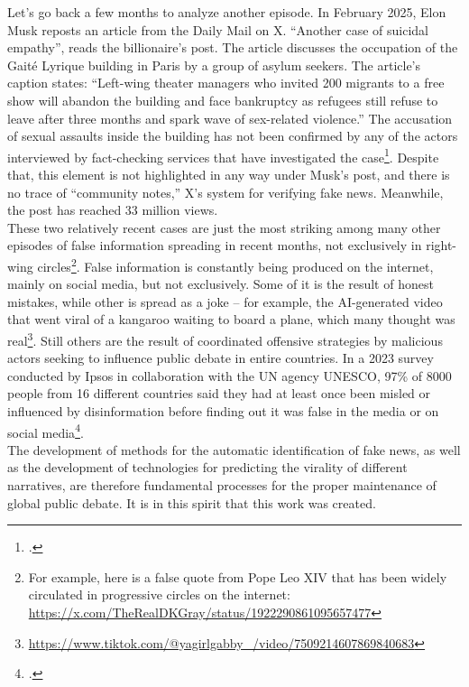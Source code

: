 \documentclass[a4paper,twoside,12pt]{book}
\begin{document}
	Let's go back a few months to analyze another episode. In February 2025, Elon Musk reposts an article from the Daily Mail on X. \enquote{Another case of suicidal empathy}, reads the billionaire's post. The article discusses the occupation of the Gaité Lyrique building in Paris by a group of asylum seekers. The article's caption states: \enquote{Left-wing theater managers who invited 200 migrants to a free show will abandon the building and face bankruptcy as refugees still refuse to leave after three months and spark wave of sex-related violence.} The accusation of sexual assaults inside the building has not been confirmed by any of the actors interviewed by fact-checking services that have investigated the case\footcite{pezet}. Despite that, this element is not highlighted in any way under Musk's post, and there is no trace of “community notes,” X's system for verifying fake news. Meanwhile, the post has reached 33 million views.\\
	
	These two relatively recent cases are just the most striking among many other episodes of false information spreading in recent months, not exclusively in right-wing circles\footnote{For example, here is a false quote from Pope Leo XIV that has been widely circulated in progressive circles on the internet: \url{https://x.com/TheRealDKGray/status/1922290861095657477}}. False information is constantly being produced on the internet, mainly on social media, but not exclusively. Some of it is the result of honest mistakes, while other is spread as a joke -- for example, the AI-generated video that went viral of a kangaroo waiting to board a plane, which many thought was real\footnote{\url{https://www.tiktok.com/@yagirlgabby_/video/7509214607869840683}}. Still others are the result of coordinated offensive strategies by malicious actors seeking to influence public debate in entire countries. In a 2023 survey conducted by Ipsos in collaboration with the UN agency UNESCO, 97\% of 8000 people from 16 different countries said they had at least once been misled or influenced by disinformation before finding out it was false in the media or on social media\footcite{ipsos2023}.\\
	
	The development of methods for the automatic identification of fake news, as well as the development of technologies for predicting the virality of different narratives, are therefore fundamental processes for the proper maintenance of global public debate.	It is in this spirit that this work was created.
	
\end{document}
